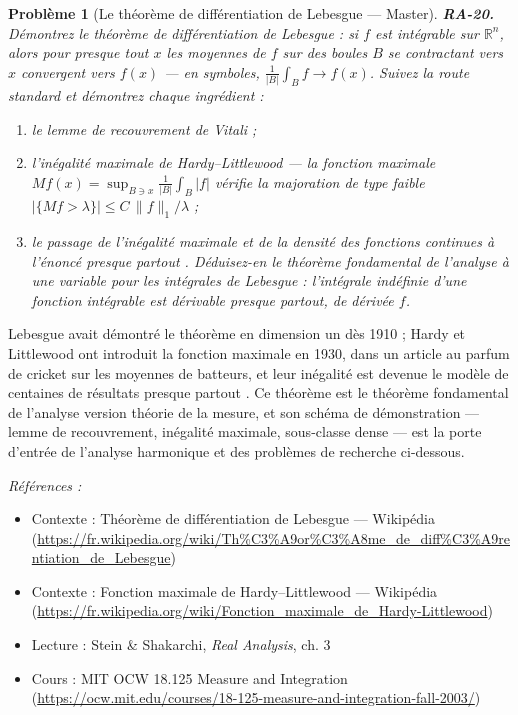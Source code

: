 \documentclass[11pt]{article}
\newtheorem{problem}{Problème}
\newenvironment{refs}{\par\small\noindent\emph{Références :}\begin{itemize}\setlength\itemsep{0pt}}{\end{itemize}\normalsize}
\begin{document}
\begin{problem}[{Le théorème de différentiation de Lebesgue --- Master}]
\textbf{RA-20.} Démontrez le théorème de différentiation de Lebesgue : si $ f $ est
intégrable sur $ \mathbb{R}^n $, alors pour presque tout $ x $ les moyennes de $ f $ sur des
boules $ B $ se contractant vers $ x $ convergent vers $ f(x) $ --- en symboles,
$ \frac{1}{|B|} \int_B f \to f(x) $. Suivez la route standard et démontrez chaque ingrédient :
\begin{enumerate}
\item[(a)] le lemme de recouvrement de Vitali ;
\item[(b)] l'inégalité maximale de Hardy--Littlewood --- la fonction
maximale $ Mf(x) = \sup_{B \ni x} \frac{1}{|B|} \int_B |f| $ vérifie la majoration de type faible
$ |\{ Mf > \lambda \}| \le C \, \|f\|_1 / \lambda $ ;
\item[(c)] le passage de l'inégalité maximale et de la
densité des fonctions continues à l'énoncé \og{} presque partout \fg{}. Déduisez-en le théorème fondamental
de l'analyse à une variable pour les intégrales de Lebesgue : l'intégrale indéfinie d'une fonction
intégrable est dérivable presque partout, de dérivée $ f $.
\end{enumerate}

\end{problem}

\noindent Lebesgue avait démontré le théorème en dimension un dès 1910 ; Hardy et
Littlewood ont introduit la fonction maximale en 1930, dans un article au parfum de cricket sur les
moyennes de batteurs, et leur inégalité est devenue le modèle de centaines de résultats \og{} presque
partout \fg{}. Ce théorème est le théorème fondamental de l'analyse version théorie de la mesure, et son
schéma de démonstration --- lemme de recouvrement, inégalité maximale, sous-classe dense --- est la
porte d'entrée de l'analyse harmonique et des problèmes de recherche ci-dessous.

\begin{refs}
\item Contexte : Théorème de différentiation de Lebesgue --- Wikipédia (\url{https://fr.wikipedia.org/wiki/Th%C3%A9or%C3%A8me_de_diff%C3%A9rentiation_de_Lebesgue})
\item Contexte : Fonction maximale de Hardy--Littlewood --- Wikipédia (\url{https://fr.wikipedia.org/wiki/Fonction_maximale_de_Hardy-Littlewood})
\item Lecture : Stein \& Shakarchi, \textit{Real Analysis}, ch. 3
\item Cours : MIT OCW 18.125 Measure and Integration (\url{https://ocw.mit.edu/courses/18-125-measure-and-integration-fall-2003/})
\end{refs}
\end{document}
